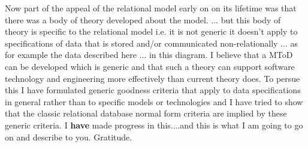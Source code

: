 \documentclass[12pt,a4paper]{article}
\theoremstyle{remark}
\begin{document}
\note 
Now part of the appeal of the relational model early on on its lifetime was that there was   a body of theory developed about the model. 
... but this body of theory is specific to the relational model i.e. it is not generic it doesn't apply to specifications of data that is stored and/or communicated non-relationally ... as for example the data described here ... in this diagram.
\note
I believe that a MToD can be developed which is generic and that such a theory can support software technology and engineering more effectively than current theory does. To persue this I have formulated generic goodness criteria that apply to data specifications in general rather than to specific models or technologies and I have tried to show that the classic relational database normal form criteria are implied by these generic criteria. 
I \textbf{have} made progress in this....and  this is what I am going  to go on and describe to you. Gratitude.
\end{document}
